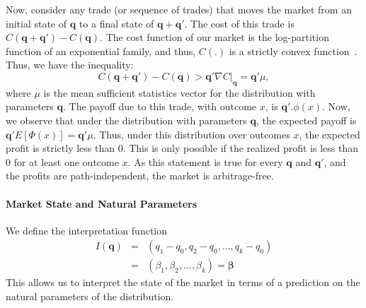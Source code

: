 \documentclass{article}
\newcommand{\betavec}{\pmb{\beta}}
\newcommand{\qvec}{\mathbf{q}}
\begin{document}
Now, consider any trade (or sequence of trades) that moves the market from an initial state of $\qvec$ to a final state of $\qvec + \qvec'$. The cost of this trade is $C(\qvec + \qvec') - C(\qvec)$. The cost function of our market is the log-partition function of an exponential family, and thus, $C(.)$ is a strictly convex function~\cite{WainJordan08}. Thus, we have the inequality:
\[
   C(\qvec + \qvec') - C(\qvec)  > \qvec' \nabla C|_\qvec = \qvec' \mu,
 \]
 where $\mu$ is the mean sufficient statistics vector for the distribution with parameters $\qvec$.
The payoff due to this trade, with outcome $x$, is $\qvec'.\phi(x)$. 
Now, we observe that under the distribution with parameters $\qvec$, the expected payoff is $\qvec' E[\Phi(x)] = \qvec' \mu$. Thus, under this distribution over outcomes $x$, the expected profit is strictly less than $0$. This is only possible if the
realized profit is less than $0$ for at least one outcome $x$. As this statement is true for every $\qvec$ and $\qvec'$, and the profits are path-independent, the market is arbitrage-free.



\paragraph{Market State and Natural Parameters}
We define the interpretation function 
\begin{eqnarray}\label{eqn:int}
I(\qvec)&=&(q_{1}-q_{0},q_{2}-q_{0},\ldots,q_{k}-q_{0})\nonumber\\
&=&(\beta_{1}, \beta_{2},\ldots, \beta_{k})=\betavec
\end{eqnarray}
This allows us to interpret the state of the market in terms of a prediction on the natural parameters of the distribution.
\end{document}
